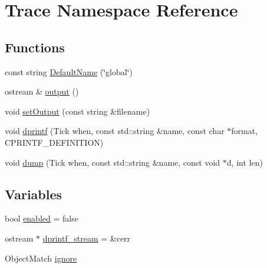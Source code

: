 \hypertarget{namespaceTrace}{
\section{Trace Namespace Reference}
\label{namespaceTrace}
}
\subsection*{Functions}
\begin{DoxyCompactItemize}
\item 
const string \hyperlink{namespaceTrace_a8606dda8a833927860293af0c77f06a4}{DefaultName} (\char`\"{}global\char`\"{})
\item 
ostream \& \hyperlink{namespaceTrace_a478c683cf31381c187f84631beef9e0a}{output} ()
\item 
void \hyperlink{namespaceTrace_ae05e11a017b6a616b42b8466c09a5dd1}{setOutput} (const string \&filename)
\item 
void \hyperlink{namespaceTrace_a06c3e4f91b64a7d89d659141b272bccc}{dprintf} (Tick when, const std::string \&name, const char $\ast$format, CPRINTF\_\-DEFINITION)
\item 
void \hyperlink{namespaceTrace_a820d9033b0366d37ca820c184de3fa86}{dump} (Tick when, const std::string \&name, const void $\ast$d, int len)
\end{DoxyCompactItemize}
\subsection*{Variables}
\begin{DoxyCompactItemize}
\item 
bool \hyperlink{namespaceTrace_a7eceed02e84cba66f80ba6e5fc184ebc}{enabled} = false
\item 
ostream $\ast$ \hyperlink{namespaceTrace_a58559cb033c06f1aa031c3c3da03c324}{dprintf\_\-stream} = \&cerr
\item 
ObjectMatch \hyperlink{namespaceTrace_a58099233c1194638eed4e30f4adfed73}{ignore}
\end{DoxyCompactItemize}


